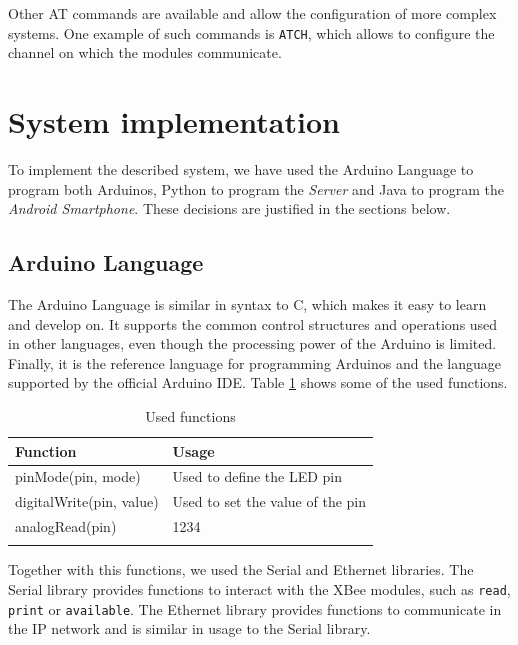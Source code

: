 \documentclass[conference, a4paper]{IEEEtran}
\begin{document}
Other AT commands are available and allow the configuration of more complex systems. One example of such commands is \texttt{ATCH}, which allows to configure the channel on which the modules communicate.

\section{System implementation}
\label{sys_impl}

To implement the described system, we have used the Arduino Language to program both Arduinos, Python to program the \textit{Server} and Java to program the \textit{Android Smartphone}. These decisions are justified in the sections below.

\subsection{Arduino Language}

The Arduino Language is similar in syntax to C, which makes it easy to learn and develop on. It supports the common control structures and operations used in other languages, even though the processing power of the Arduino is limited. Finally, it is the reference language for programming Arduinos and the language supported by the official Arduino IDE. Table \ref{table_funs} shows some of the used functions.

\begin{table}[h]
\centering
\begin{tabular}{ll}
Function                                  & Usage                                             \\ \hline
\rowcolor[HTML]{EFEFEF} 
{\color[HTML]{333333} pinMode(pin, mode)} & {\color[HTML]{333333} Used to define the LED pin} \\
digitalWrite(pin, value)                  & Used to set the value of the pin                  \\
\rowcolor[HTML]{EFEFEF} 
analogRead(pin)                           & 1234        \\
&
\end{tabular}
\caption{Used functions}
\label{table_funs}
\end{table}

Together with this functions, we used the Serial and Ethernet libraries. The Serial library provides functions to interact with the XBee modules, such as \texttt{read}, \texttt{print} or \texttt{available}. The Ethernet library provides functions to communicate in the IP network and is similar in usage to the Serial library.
\end{document}
